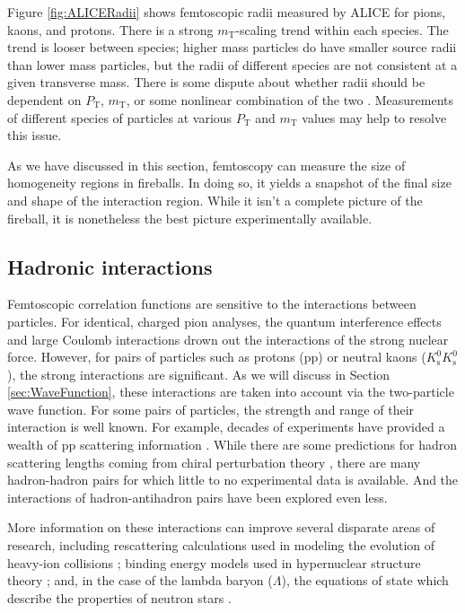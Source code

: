Figure \ref{fig:ALICERadii} shows femtoscopic radii measured by ALICE for pions, kaons, and protons.
There is a strong $m_\mathrm{T}$-scaling trend within each species.
The trend is looser between species; higher mass particles do have smaller source radii than lower mass particles, but the radii of different species are not consistent at a given transverse mass.
There is some dispute about whether radii should be dependent on $P_\mathrm{T}$, $m_\mathrm{T}$, or some nonlinear combination of the two \cite{Sinyukov:2015kga}.
Measurements of different species of particles at various $P_\mathrm{T}$ and $m_\mathrm{T}$ values may help to resolve this issue.

As we have discussed in this section, femtoscopy can measure the size of homogeneity regions in fireballs.
In doing so, it yields a snapshot of the final size and shape of the interaction region.
While it isn't a complete picture of the fireball, it is nonetheless the best picture experimentally available.

\subsection{Hadronic interactions}
\label{sec:HadronicInteractions}


Femtoscopic correlation functions are sensitive to the interactions between particles.
For identical, charged pion analyses, the quantum interference effects and large Coulomb interactions drown out the interactions of the strong nuclear force.
However, for pairs of particles such as protons (pp) or neutral kaons ($K^0_\mathrm{s}K^0_\mathrm{s}$), the strong interactions are significant.
As we will discuss in Section \ref{sec:WaveFunction}, these interactions are taken into account via the two-particle wave function.
For some pairs of particles, the strength and range of their interaction is well known. For example, decades of experiments have provided a wealth of pp scattering information \cite{Perez:2013jpa}.
While there are some predictions for hadron scattering lengths coming from chiral perturbation theory \cite{Mai:2009ce}, there are many hadron-hadron pairs for which little to no experimental data is available. And the interactions of hadron-antihadron pairs have been explored even less.

More information on these interactions can improve several disparate areas of research, including rescattering calculations used in modeling the evolution of heavy-ion collisions \cite{Bleicher:1999xi}; binding energy models used in hypernuclear structure theory \cite{Hiyama:2002yj,Filikhin:2002wm}; and, in the case of the lambda baryon ($\Lambda$), the equations of state which describe the properties of neutron stars \cite{SchaffnerBielich:2008kb,Wang:2010gr}.

